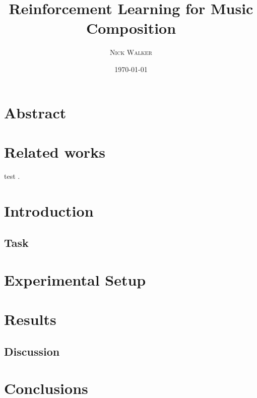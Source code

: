 \documentclass{article}
\title{Reinforcement Learning for Music Composition} %
\author{\textsc{Nick Walker}} %
\date{\today} %
\begin{document}
	\maketitle %



	\section{Abstract}

	\section{Related works}
	
	test \cite{Phon-Amnuaisuk2009}.






	\section{Introduction}

	\subsection{Task}


	\section{Experimental Setup}



	\section{Results}


	\subsection{Discussion}


	\section{Conclusions}

	{}
	
\end{document}
